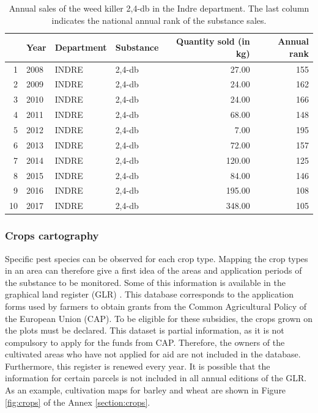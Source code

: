 \begin{table}[ht]
\centering
\begin{tabular}{rlllrr}
  \hline
 & Year & Department & Substance & Quantity sold (in kg) & Annual rank \\ 
  \hline
1 & 2008 & INDRE & 2,4-db & 27.00 & 155 \\ 
  2 & 2009 & INDRE & 2,4-db & 24.00 & 162 \\ 
  3 & 2010 & INDRE & 2,4-db & 24.00 & 166 \\ 
  4 & 2011 & INDRE & 2,4-db & 68.00 & 148 \\ 
  5 & 2012 & INDRE & 2,4-db & 7.00 & 195 \\ 
  6 & 2013 & INDRE & 2,4-db & 72.00 & 157 \\ 
  7 & 2014 & INDRE & 2,4-db & 120.00 & 125 \\ 
  8 & 2015 & INDRE & 2,4-db & 84.00 & 146 \\ 
  9 & 2016 & INDRE & 2,4-db & 195.00 & 108 \\ 
  10 & 2017 & INDRE & 2,4-db & 348.00 & 105 \\ 
   \hline
\end{tabular}
   \caption{Annual sales of the weed killer 2,4-db in the Indre department. The last column indicates the national annual rank of the substance sales.}\label{tab:bnvd}
\end{table}

\subsubsection{Crops cartography}

Specific pest species can be observed for each crop type. Mapping the crop types in an area can therefore give a first idea of the areas and application periods of the substance to be monitored. Some of this information is available in the graphical land register (GLR) \citep{RPG}. This database corresponds to the application forms used by farmers to obtain grants from the Common Agricultural Policy of the European Union (CAP). To be eligible for these subsidies, the crops grown on the plots must be declared. This dataset is partial information, as it is not compulsory to apply for the funds from CAP. Therefore, the owners of the cultivated areas who have not applied for aid are not included in the database. Furthermore, this register is renewed every year. It is possible that the information for certain parcels is not included in all annual editions of the GLR. As an example, cultivation maps for barley and wheat are shown in Figure \ref{fig:crops} of the Annex \ref{section:crops}.

